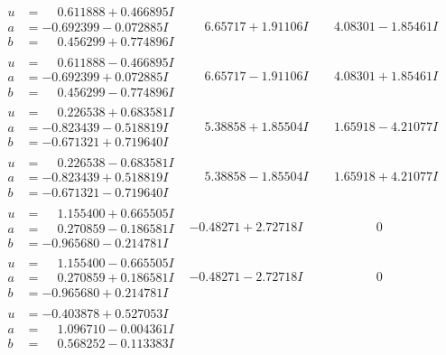 \documentclass[1p]{elsarticle_modified}
\theoremstyle{definition}
\begin{document}
$$\begin{array}{c|c|c}
\begin{aligned}
u &= \phantom{-}0.611888 + 0.466895 I \\
a &= -0.692399 - 0.072885 I \\
b &= \phantom{-}0.456299 + 0.774896 I\end{aligned}
 & \phantom{-}6.65717 + 1.91106 I & \phantom{-}4.08301 - 1.85461 I \\ \hline\begin{aligned}
u &= \phantom{-}0.611888 - 0.466895 I \\
a &= -0.692399 + 0.072885 I \\
b &= \phantom{-}0.456299 - 0.774896 I\end{aligned}
 & \phantom{-}6.65717 - 1.91106 I & \phantom{-}4.08301 + 1.85461 I \\ \hline\begin{aligned}
u &= \phantom{-}0.226538 + 0.683581 I \\
a &= -0.823439 - 0.518819 I \\
b &= -0.671321 + 0.719640 I\end{aligned}
 & \phantom{-}5.38858 + 1.85504 I & \phantom{-}1.65918 - 4.21077 I \\ \hline\begin{aligned}
u &= \phantom{-}0.226538 - 0.683581 I \\
a &= -0.823439 + 0.518819 I \\
b &= -0.671321 - 0.719640 I\end{aligned}
 & \phantom{-}5.38858 - 1.85504 I & \phantom{-}1.65918 + 4.21077 I \\ \hline\begin{aligned}
u &= \phantom{-}1.155400 + 0.665505 I \\
a &= \phantom{-}0.270859 - 0.186581 I \\
b &= -0.965680 - 0.214781 I\end{aligned}
 & -0.48271 + 2.72718 I & \phantom{-0.000000 } 0 \\ \hline\begin{aligned}
u &= \phantom{-}1.155400 - 0.665505 I \\
a &= \phantom{-}0.270859 + 0.186581 I \\
b &= -0.965680 + 0.214781 I\end{aligned}
 & -0.48271 - 2.72718 I & \phantom{-0.000000 } 0 \\ \hline\begin{aligned}
u &= -0.403878 + 0.527053 I \\
a &= \phantom{-}1.096710 - 0.004361 I \\
b &= \phantom{-}0.568252 - 0.113383 I\end{aligned}

\end{array}$$
\end{document}
